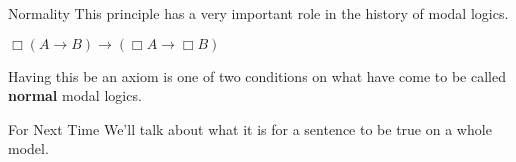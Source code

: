 \documentclass[
  ignorenonframetext,
]{beamer}
\renewcommand{\,}{\text{, }}
\renewenvironment*{quote}	
	{\list{}{\rightmargin   \leftmargin} \item } 	
	{\endlist }
\begin{document}
\begin{frame}{Normality}
\protect\hypertarget{normality-1}{}
This principle has a very important role in the history of modal logics.

\begin{quote}
\(\Box (A \rightarrow B) \rightarrow (\Box A \rightarrow \Box B)\)
\end{quote}

Having this be an axiom is one of two conditions on what have come to be
called \textbf{normal} modal logics.
\end{frame}

\begin{frame}{For Next Time}
\protect\hypertarget{for-next-time}{}
We'll talk about what it is for a sentence to be true on a whole model.
\end{frame}
\end{document}
